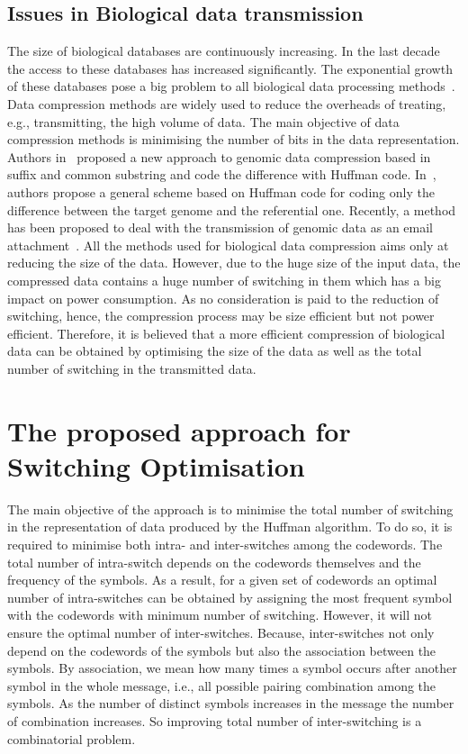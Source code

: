 \documentclass[preprint,12pt]{elsarticle}
\begin{document}
\subsection{Issues in Biological data transmission}
The size of biological databases are continuously increasing. In the last decade the access to these databases has increased significantly. The exponential growth of these databases pose a big problem to all biological data processing methods~\cite{Doug08}. Data compression methods are widely used to reduce the overheads of treating, e.g., transmitting, the high volume of data. The main objective of data compression methods is minimising the number of bits in the data representation. Authors in~\cite{bra09} proposed a new approach to genomic data compression based in suffix and common substring and code the difference with Huffman code. In~\cite{chr09}, authors propose a general scheme based on Huffman code for coding only the difference between the target genome and the referential one. Recently, a method has been proposed to deal with the transmission of genomic data as an email attachment~\cite{wan11}. All the methods used for biological data compression aims only at reducing the size of the data. However, due to the huge size of the input data, the compressed data contains a huge number of switching in them which has a big impact on power consumption. As no consideration is paid to the reduction of switching, hence, the compression process may be size efficient but not power efficient. Therefore, it is believed that a more efficient compression of biological data can be obtained by optimising the size of the data as well as the total number of switching in the transmitted data. %
\section{The proposed approach for Switching Optimisation}
The main objective of the approach is to minimise the total number of switching in the representation of data produced by the Huffman algorithm. To do so, it is required to minimise both intra- and inter-switches among the codewords. The total number of intra-switch depends on the codewords themselves and the frequency of the symbols. As a result, for  a given set of codewords an optimal number of intra-switches can be obtained by assigning the most frequent symbol with the codewords with minimum number of switching. However, it will not ensure the optimal number of inter-switches. Because, inter-switches not only depend on the codewords of the symbols but also the association between the symbols. By association, we mean how many times a symbol occurs after another symbol in the whole message, i.e., all possible pairing combination among the symbols. As the number of distinct symbols increases in the message the number of combination increases. So improving total number of inter-switching is a combinatorial problem.
\end{document}
